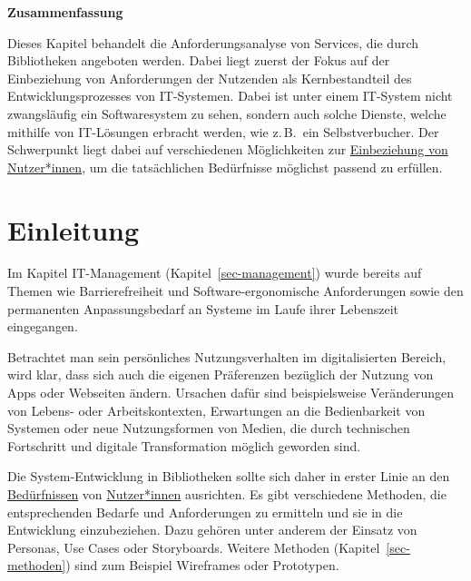 \documentclass[
  11pt,
  letterpaper,
  DIV=11,
  twoside]{scrreprt}
\begin{document}
\begin{tcolorbox}[enhanced jigsaw, leftrule=.75mm, toprule=.15mm, left=2mm, opacityback=0, arc=.35mm, colback=white, breakable, colframe=quarto-callout-note-color-frame, rightrule=.15mm, bottomrule=.15mm]
\begin{minipage}[t]{5.5mm}
\textcolor{quarto-callout-note-color}{\faInfo}
\end{minipage}%
\begin{minipage}[t]{\textwidth - 5.5mm}

\vspace{-3mm}\textbf{Zusammenfassung}\vspace{3mm}

Dieses Kapitel behandelt die Anforderungsanalyse von Services, die durch
Bibliotheken angeboten werden. Dabei liegt zuerst der Fokus auf der
Einbeziehung von Anforderungen der Nutzenden als Kernbestandteil des
Entwicklungsprozesses von IT-Systemen. Dabei ist unter einem IT-System
nicht zwangsläufig ein Softwaresystem zu sehen, sondern auch solche
Dienste, welche mithilfe von IT-Lösungen erbracht werden, wie z.\,B.~ein
Selbstverbucher. Der Schwerpunkt liegt dabei auf verschiedenen
Möglichkeiten zur \hyperref[einbeziehung]{Einbeziehung von
Nutzer*innen}, um die tatsächlichen Bedürfnisse möglichst passend zu
erfüllen.

\end{minipage}%
\end{tcolorbox}

\section{Einleitung}\label{einleitung-3}

Im Kapitel IT-Management (Kapitel~\ref{sec-management}) wurde bereits
auf Themen wie Barrierefreiheit und Software-ergonomische Anforderungen
sowie den permanenten Anpassungsbedarf an Systeme im Laufe ihrer
Lebenszeit eingegangen.

Betrachtet man sein persönliches Nutzungsverhalten im digitalisierten
Bereich, wird klar, dass sich auch die eigenen Präferenzen bezüglich der
Nutzung von Apps oder Webseiten ändern. Ursachen dafür sind
beispielsweise Veränderungen von Lebens- oder Arbeitskontexten,
Erwartungen an die Bedienbarkeit von Systemen oder neue Nutzungsformen
von Medien, die durch technischen Fortschritt und digitale
Transformation möglich geworden sind.

Die System-Entwicklung in Bibliotheken sollte sich daher in erster Linie
an den \hyperref[bedarfsermittlung]{Bedürfnissen} von
\hyperref[einbeziehung]{Nutzer*innen} ausrichten. Es gibt verschiedene
Methoden, die entsprechenden Bedarfe und Anforderungen zu ermitteln und
sie in die Entwicklung einzubeziehen. Dazu gehören unter anderem der
Einsatz von Personas, Use Cases oder Storyboards. Weitere Methoden
(Kapitel~\ref{sec-methoden}) sind zum Beispiel Wireframes oder
Prototypen.
\end{document}
